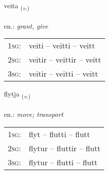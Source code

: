 \documentclass[frontgrid, backgrid]{flacards}\usepackage[]{graphicx}\usepackage[]{xcolor}
\begin{document}
{veita \small{\textsubscript{(\textit{v.})}} \\[1ex] %
\textphonetic{[veiːta]} \\
en.: \emph{grant, give} \\  [2ex]
\renewcommand*{\arraystretch}{0.8}
\begin{tabular}{p{1cm}l}
\textsc{1sg}: & veiti -- veitti -- veitt \\ 
\textsc{2sg}: & veitir -- veittir -- veitt \\ 
\textsc{3sg}: & veitir -- veitti -- veitt \\ 
\end{tabular}
}

\renewcommand{\flhead}{\vskip5pt \fboxsep=0pt {\small\bfseries\footnotesize Sagnorð | Verb}}
\renewcommand{\fcfoot}{\vskip5pt \fboxsep=0pt \hspace{2pt}{\small\bfseries\footnotesize 1K}}

\renewcommand{\blhead}{\vskip5pt {\small\bfseries\footnotesize Sagnorð | Verb }}
\renewcommand{\bcfoot}{\vskip5pt \hspace{2pt}{\small\bfseries\footnotesize 1K}}


{flytja \small{\textsubscript{(\textit{v.})}} \\[1ex] %
\textphonetic{[flɪːtja]} \\
en.: \emph{move; transport} \\  [2ex]
\renewcommand*{\arraystretch}{0.8}
\begin{tabular}{p{1cm}l}
\textsc{1sg}: & flyt -- flutti -- flutt \\ 
\textsc{2sg}: & flytur -- fluttir -- flutt \\ 
\textsc{3sg}: & flytur -- flutti -- flutt \\ 
\end{tabular}
}

\renewcommand{\flhead}{\vskip5pt \fboxsep=0pt {\small\bfseries\footnotesize Nafnorð | Noun}}
\renewcommand{\fcfoot}{\vskip5pt \fboxsep=0pt \hspace{2pt}{\small\bfseries\footnotesize 1K}}
\end{document}
